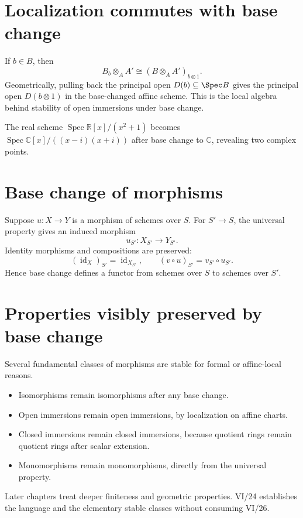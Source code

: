 \section{Localization commutes with base change}
If $b\in B$, then
\[
B_b\otimes_AA'\cong(B\otimes_AA')_{b\otimes1}.
\]
Geometrically, pulling back the principal open $D(b)\subseteq\Spec B$ gives the principal open
$D(b\otimes1)$ in the base-changed affine scheme.  This is the local algebra behind stability of
open immersions under base change.



\begin{example}\label{ex:vi24-expand-02}
The real scheme $\operatorname{Spec}\mathbb R[x]/(x^2+1)$ becomes $\operatorname{Spec}\mathbb C[x]/((x-i)(x+i))$ after base change to $\mathbb C$, revealing two complex points.
\end{example}
\section{Base change of morphisms}
Suppose $u:X\to Y$ is a morphism of schemes over $S$.  For $S'\to S$, the universal property gives
an induced morphism
\[
u_{S'}:X_{S'}\longrightarrow Y_{S'}.
\]
Identity morphisms and compositions are preserved:
\[
(\operatorname{id}_X)_{S'}=\operatorname{id}_{X_{S'}},
\qquad
(v\circ u)_{S'}=v_{S'}\circ u_{S'}.
\]
Hence base change defines a functor from schemes over $S$ to schemes over $S'$.

\section{Properties visibly preserved by base change}
Several fundamental classes of morphisms are stable for formal or affine-local reasons.
\begin{itemize}
\item Isomorphisms remain isomorphisms after any base change.
\item Open immersions remain open immersions, by localization on affine charts.
\item Closed immersions remain closed immersions, because quotient rings remain quotient rings after
scalar extension.
\item Monomorphisms remain monomorphisms, directly from the universal property.
\end{itemize}
Later chapters treat deeper finiteness and geometric properties.  VI/24 establishes the language and
the elementary stable classes without consuming VI/26.

